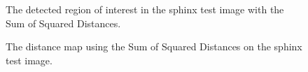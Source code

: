 \begin{figure}
	\centering
	\begin{minipage}[t]{0.49\linewidth}
		\centering
		\caption{The detected region of interest in the sphinx test image with the Sum of Squared Distances.}
		\label{fig:8_1}
	\end{minipage}
	\hfill
	\begin{minipage}[t]{0.49\linewidth}
		\centering
		\caption{The distance map using the Sum of Squared Distances on the sphinx test image.}
		\label{fig:8_2}
	\end{minipage}
\end{figure}

